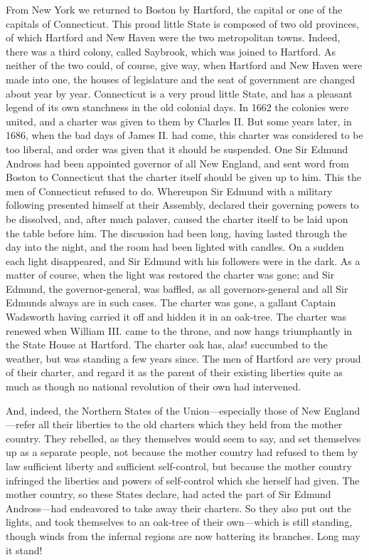 From New York we returned to Boston by Hartford, the capital or one
of the capitals of Connecticut.  This proud little State is
composed of two old provinces, of which Hartford and New Haven were
the two metropolitan towns.  Indeed, there was a third colony,
called Saybrook, which was joined to Hartford.  As neither of the
two could, of course, give way, when Hartford and New Haven were
made into one, the houses of legislature and the seat of government
are changed about year by year.  Connecticut is a very proud little
State, and has a pleasant legend of its own stanchness in the old
colonial days.  In 1662 the colonies were united, and a charter was
given to them by Charles II.  But some years later, in 1686, when
the bad days of James II. had come, this charter was considered to
be too liberal, and order was given that it should be suspended.
One Sir Edmund Andross had been appointed governor of all New
England, and sent word from Boston to Connecticut that the charter
itself should be given up to him.  This the men of Connecticut
refused to do.  Whereupon Sir Edmund with a military following
presented himself at their Assembly, declared their governing
powers to be dissolved, and, after much palaver, caused the charter
itself to be laid upon the table before him.  The discussion had
been long, having lasted through the day into the night, and the
room had been lighted with candles.  On a sudden each light
disappeared, and Sir Edmund with his followers were in the dark.
As a matter of course, when the light was restored the charter was
gone; and Sir Edmund, the governor-general, was baffled, as all
governors-general and all Sir Edmunds always are in such cases.
The charter was gone, a gallant Captain Wadsworth having carried it
off and hidden it in an oak-tree.  The charter was renewed when
William III. came to the throne, and now hangs triumphantly in the
State House at Hartford.  The charter oak has, alas! succumbed to
the weather, but was standing a few years since.  The men of
Hartford are very proud of their charter, and regard it as the
parent of their existing liberties quite as much as though no
national revolution of their own had intervened.

And, indeed, the Northern States of the Union---especially those of
New England---refer all their liberties to the old charters which
they held from the mother country.  They rebelled, as they
themselves would seem to say, and set themselves up as a separate
people, not because the mother country had refused to them by law
sufficient liberty and sufficient self-control, but because the
mother country infringed the liberties and powers of self-control
which she herself had given.  The mother country, so these States
declare, had acted the part of Sir Edmund Andross---had endeavored
to take away their charters.  So they also put out the lights, and
took themselves to an oak-tree of their own---which is still
standing, though winds from the infernal regions are now battering
its branches.  Long may it stand!

